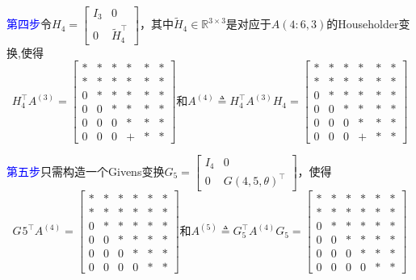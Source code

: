 \documentclass[12pt,a4paper]{article}
\begin{document}
\textcolor{blue}{第四步}\quad 令$H_{4}=\left[\begin{array}{cc}{I_3} & {0} \\ {0} & {\tilde{H}_{4}^{\top}}  \end{array}\right]$，其中$\tilde{H}_{4} \in \mathbb{R}^{3 \times 3}$是对应于$A(4: 6,3)$的Householder变换,使得$$
H_{4}^{\top} A^{(3)}=\left[\begin{array}{cccccc}{*} & {*} & {*}& {*}& {*}& {*} \\ {*} & {*} & {*} & {*}& {*}& {*}\\ {0} & {*} & {*} & {*} & {*}& {*}\\ {0} & {0} & {*} & {*}& {*}& {*}\\ {0} & {0} & {0} & {*}& {*}& {*}\\ {0} & {0} & {0} & {+}& {*}& {*}\end{array}\right]
\text{和}A^{(4)} \triangleq H_{4}^{\top} A^{(3)} H_{4}=\left[\begin{array}{cccccc}{*} & {*} & {*}& {*}& {*}& {*} \\ {*} & {*} & {*} & {*}& {*}& {*}\\ {0} & {*} & {*} & {*} & {*}& {*}\\ {0} & {0} & {*} & {*}& {*}& {*}\\ {0} & {0} & {0} & {*}& {*}& {*}\\ {0} & {0} & {0} & {+}& {*}& {*}\end{array}\right]
$$

\textcolor{blue}{第五步}\quad 只需构造一个Givens变换$G_{5}=\left[\begin{array}{cc}{I_4} & {0} \\ {0} & {G(4,5,\theta)^{\top}}  \end{array}\right]$，使得$$
G_{}5^{\top} A^{(4)}=\left[\begin{array}{cccccc}{*} & {*} & {*}& {*}& {*}& {*} \\ {*} & {*} & {*} & {*}& {*}& {*}\\ {0} & {*} & {*} & {*} & {*}& {*}\\ {0} & {0} & {*} & {*}& {*}& {*}\\ {0} & {0} & {0} & {*}& {*}& {*}\\ {0} & {0} & {0} & {0}& {*}& {*}\end{array}\right]
\text{和}A^{(5)} \triangleq G_{5}^{\top} A^{(4)} G_{5}=\left[\begin{array}{cccccc}{*} & {*} & {*}& {*}& {*}& {*} \\ {*} & {*} & {*} & {*}& {*}& {*}\\ {0} & {*} & {*} & {*} & {*}& {*}\\ {0} & {0} & {*} & {*}& {*}& {*}\\ {0} & {0} & {0} & {*}& {*}& {*}\\ {0} & {0} & {0} & {0}& {*}& {*}\end{array}\right]
$$
\end{document}
